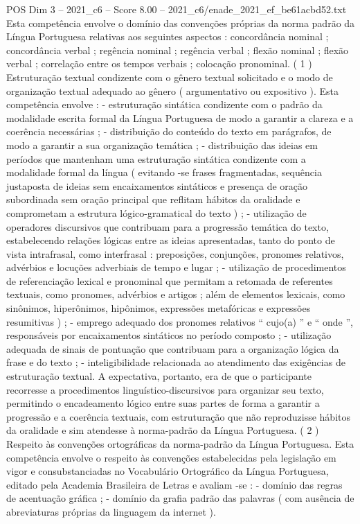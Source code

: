 \begin{textsample}{POS Dim 3 – 2021\_c6 – Score 8.00 – 2021\_c6/enade\_2021\_ef\_be61acbd52.txt}
Esta competência envolve o domínio das convenções próprias da norma padrão da Língua Portuguesa relativas aos seguintes aspectos : concordância nominal ; concordância verbal ; regência nominal ; regência verbal ; flexão nominal ; flexão verbal ; correlação entre os tempos verbais ; colocação pronominal. ( 1 ) Estruturação textual condizente com o gênero textual solicitado e o modo de organização textual adequado ao gênero ( argumentativo ou expositivo ).
Esta competência envolve : - estruturação sintática condizente com o padrão da modalidade escrita formal da Língua Portuguesa de modo a garantir a clareza e a coerência necessárias ; - distribuição do conteúdo do texto em parágrafos, de modo a garantir a sua organização temática ; - distribuição das ideias em períodos que mantenham uma estruturação sintática condizente com a modalidade formal da língua ( evitando -se frases fragmentadas, sequência justaposta de ideias sem encaixamentos sintáticos e presença de oração subordinada sem oração principal que reflitam hábitos da oralidade e comprometam a estrutura lógico-gramatical do texto ) ; - utilização de operadores discursivos que contribuam para a progressão temática do texto, estabelecendo relações lógicas entre as ideias apresentadas, tanto do ponto de vista intrafrasal, como interfrasal : preposições, conjunções, pronomes relativos, advérbios e locuções adverbiais de tempo e lugar ; - utilização de procedimentos de referenciação lexical e pronominal que permitam a retomada de referentes textuais, como pronomes, advérbios e artigos ; além de elementos lexicais, como sinônimos, hiperônimos, hipônimos, expressões metafóricas e expressões resumitivas ) ; - emprego adequado dos pronomes relativos “ cujo(a) ” e “ onde ”, responsáveis por encaixamentos sintáticos no período composto ; - utilização adequada de sinais de pontuação que contribuam para a organização lógica da frase e do texto ; - inteligibilidade relacionada ao atendimento das exigências de estruturação textual.
A expectativa, portanto, era de que o participante recorresse a procedimentos linguístico-discursivos para organizar seu texto, permitindo o encadeamento lógico entre suas partes de forma a garantir a progressão e a coerência textuais, com estruturação que não reproduzisse hábitos da oralidade e sim atendesse à norma-padrão da Língua Portuguesa. ( 2 ) Respeito às convenções ortográficas da norma-padrão da Língua Portuguesa.
Esta competência envolve o respeito às convenções estabelecidas pela legislação em vigor e consubstanciadas no Vocabulário Ortográfico da Língua Portuguesa, editado pela Academia Brasileira de Letras e avaliam -se : - domínio das regras de acentuação gráfica ; - domínio da grafia padrão das palavras ( com ausência de abreviaturas próprias da linguagem da internet ).

\end{textsample}
